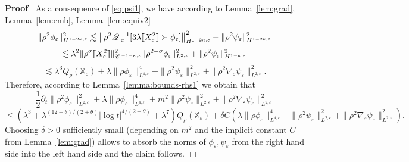 \documentclass[a4paper,11pt]{article}
\newenvironment{proof}{\noindent\textbf{Proof\ }}{\hspace*{\fill}$\Box$\medskip}
\numberwithin{equation}{section}
\newcommand{\CC}{\mathscr{C} \hspace{.1em}}
\newcommand{\Q}{\mathscr{Q} \hspace{.2em}}
\begin{document}
\begin{proof}
  As a consequence of {\eqref{eq:psi1}}, we have according to Lemma~\ref{lem:grad}, Lemma~\ref{lem:emb}, Lemma~\ref{lem:equiv2}
  \[ \| \rho^2 \phi_{\varepsilon} \|_{H^{1 - 2 \kappa, \varepsilon}}^2
     \lesssim \left\| \rho^2 \Q_{\varepsilon}^{- 1} [3\lambda\llbracket
     X_{\varepsilon}^2 \rrbracket \succ \phi_{\varepsilon}] \right\|_{H^{1 - 2
     \kappa, \varepsilon}}^2 + \| \rho^2 \psi_{\varepsilon} \|_{H^{1 - 2
     \kappa, \varepsilon}}^2 \]
  \[ \lesssim \lambda^2 \| \rho^{\sigma} \llbracket X_{\varepsilon}^2 \rrbracket
     \|^2_{\CC^{- 1 - \kappa, \varepsilon}} \| \rho^{2 - \sigma}
     \phi_{\varepsilon} \|^2_{L^{2, \varepsilon}} + \| \rho^2
     \psi_{\varepsilon} \|_{H^{1 - \kappa, \varepsilon}}^2 \]
  \begin{equation}
    \lesssim \lambda^3 Q_{\rho} (\mathbb{X}_{\varepsilon}) + \lambda \| \rho \phi_{\varepsilon}
    \|_{L^{4, \varepsilon}}^4 + \| \rho^2 \psi_{\varepsilon} \|_{L^{2,
    \varepsilon}}^2 + \| \rho^2 \nabla_{\varepsilon} \psi_{\varepsilon}
    \|_{L^{2, \varepsilon}}^2 . \label{eq:17}
  \end{equation}
  Therefore, according to Lemma~\ref{lemma:bounds-rhs1} we obtain that
  \[ \frac{1}{2} \partial_t \| \rho^2 \phi_{\varepsilon} \|_{L^{2,
     \varepsilon}}^2 +\lambda \| \rho \phi_{\varepsilon} \|_{L^{4, \varepsilon}}^4 +
     m^{2} \| \rho^2 \psi_{\varepsilon} \|_{L^{2, \varepsilon}}^2 + \| \rho^2
     \nabla_{\varepsilon} \psi_{\varepsilon} \|_{L^{2, \varepsilon}}^2  \]
  \[ \leqslant(\lambda^3 + \lambda^{(12 - \theta)
     / (2 + \theta)} | \log t|^{4 / (2 + \theta)} + \lambda^{7})Q_{\rho} (\mathbb{X}_{\varepsilon}) + \delta C
     (\lambda\| \rho \phi_{\varepsilon} \|_{L^{4, \varepsilon}}^4 + \| \rho^2
     \psi_{\varepsilon} \|_{L^{2, \varepsilon}}^2 + \| \rho^2
     \nabla_{\varepsilon} \psi_{\varepsilon} \|_{L^{2, \varepsilon}}^2). \]
Choosing $\delta > 0$ sufficiently small (depending  on $m^2$ and the implicit constant $C$ from Lemma~\ref{lem:grad}) allows to absorb the norms of
  $\phi_{\varepsilon}, \psi_{\varepsilon}$ from the right hand side into the
  left hand side and the claim follows.
\end{proof}
\end{document}
